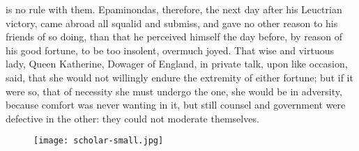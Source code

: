 {{is no rule with them. Epaminondas, therefore, the next day after his
Leuctrian victory, came abroad all squalid and submiss, and gave
no other reason to his friends of so doing, than that he perceived
himself the day before, by reason of his good fortune, to be too
insolent, overmuch joyed. That wise and virtuous lady, Queen
Katherine, Dowager of England, in private talk, upon like occasion,
said, that she would not willingly endure the extremity of either
fortune; but if it were so, that of necessity she must undergo the one,
she would be in adversity, because comfort was never wanting in it, but
still counsel and government were defective in the other: they could
not moderate themselves.

\cleartoleftpage{}
\begin{figure}[p]
  \begingroup
  \centering
  \texttt{[image: scholar-small.jpg]}
  \label{fig:scholar}
\end{figure}

\clearpage{}
\thispagestyle{titleontop}

}}
